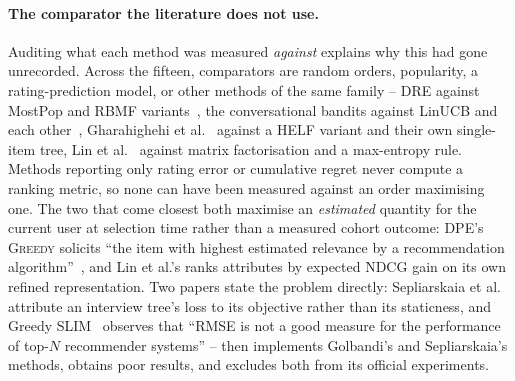 \documentclass[runningheads]{llncs}
\begin{document}
\paragraph{The comparator the literature does not use.}
Auditing what each method was measured \emph{against} explains why this had gone unrecorded. Across
the fifteen, comparators are random orders, popularity, a
rating-prediction model, or other methods of the same family -- DRE against MostPop and RBMF
variants~\cite{kweon2020deep}, the conversational bandits against LinUCB and each
other~\cite{zhang2020conucb,wang2023conlinucb,liu2025clisk}, Gharahighehi et
al.~\cite{gharahighehi2025pairwise} against a HELF variant and their own single-item tree, Lin et
al.~\cite{lin2023upsrec} against matrix factorisation and a max-entropy rule. Methods reporting only rating error or cumulative regret never compute a ranking
metric, so none can have been measured against an order maximising one. The two that come closest
both maximise an \emph{estimated} quantity for the current user at selection time rather than a
measured cohort outcome: DPE's \textsc{Greedy} solicits ``the item with highest estimated relevance
by a recommendation algorithm''~\cite{parapar2021dpe}, and Lin et al.'s ranks attributes by expected
NDCG gain on its own refined representation. Two papers state the problem directly: Sepliarskaia et
al.~\cite{sepliarskaia2018spq} attribute an interview tree's loss to its objective rather than its
staticness, and Greedy SLIM~\cite{proissl2024greedyslim} observes
that ``RMSE is not a good measure for the performance of top-$N$ recommender systems'' -- then
implements Golbandi's and Sepliarskaia's methods, obtains poor results, and excludes both from its
official experiments.
\end{document}
